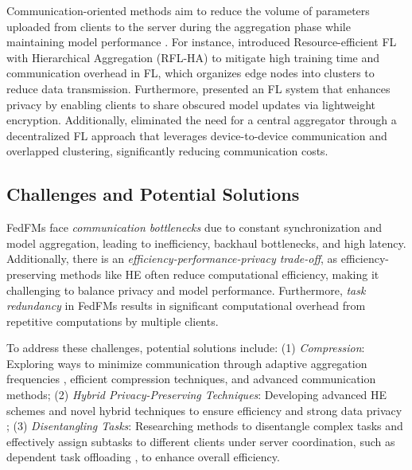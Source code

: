 Communication-oriented methods aim to reduce the volume of parameters uploaded from clients to the server during the aggregation phase while maintaining model performance \cite{wang2021resource, hu2021mhat}. For instance, \citet{wang2021resource} introduced Resource-efficient FL with Hierarchical Aggregation (RFL-HA) to mitigate high training time and communication overhead in FL, which organizes edge nodes into clusters to reduce data transmission. Furthermore, \citet{zheng2022aggregation} presented an FL system that enhances privacy by enabling clients to share obscured model updates via lightweight encryption. Additionally, \citet{al2023decentralized} eliminated the need for a central aggregator through a decentralized FL approach that leverages device-to-device communication and overlapped clustering, significantly reducing communication costs. 




\subsection{Challenges and Potential Solutions}

FedFMs face \textit{communication bottlenecks} due to constant synchronization and model aggregation, leading to inefficiency, backhaul bottlenecks, and high latency. Additionally, there is an \textit{efficiency-performance-privacy trade-off}, as efficiency-preserving methods like HE often reduce computational efficiency, making it challenging to balance privacy and model performance. Furthermore, \textit{task redundancy} in FedFMs results in significant computational overhead from repetitive computations by multiple clients.

To address these challenges, potential solutions include: (1) \textit{Compression}: Exploring ways to minimize communication through adaptive aggregation frequencies \cite{lee2023layer}, efficient compression techniques, and advanced communication methods; (2) \textit{Hybrid Privacy-Preserving Techniques}: Developing advanced HE schemes and novel hybrid techniques to ensure efficiency and strong data privacy \cite{254465}; (3) \textit{Disentangling Tasks}: Researching methods to disentangle complex tasks and effectively assign subtasks to different clients under server coordination, such as dependent task offloading \cite{wang2021dependent}, to enhance overall efficiency.



